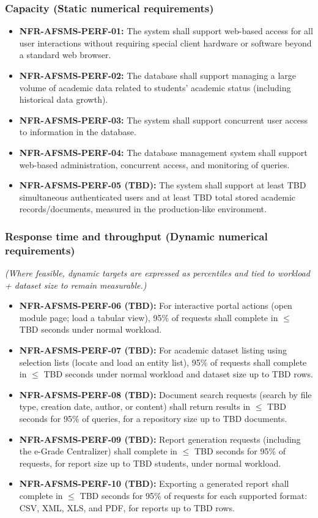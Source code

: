 \documentclass[11pt, a4paper]{article}
\begin{document}
\subsubsection{Capacity (Static numerical requirements)}
\begin{itemize}
    \item \textbf{NFR-AFSMS-PERF-01:} The system shall support web-based access for all user interactions without requiring special client hardware or software beyond a standard web browser.
    \item \textbf{NFR-AFSMS-PERF-02:} The database shall support managing a large volume of academic data related to students' academic status (including historical data growth).
    \item \textbf{NFR-AFSMS-PERF-03:} The system shall support concurrent user access to information in the database.
    \item \textbf{NFR-AFSMS-PERF-04:} The database management system shall support web-based administration, concurrent access, and monitoring of queries.
    \item \textbf{NFR-AFSMS-PERF-05 (TBD):} The system shall support at least TBD simultaneous authenticated users and at least TBD total stored academic records/documents, measured in the production-like environment.
\end{itemize}

\subsubsection{Response time and throughput (Dynamic numerical requirements)}
\textit{(Where feasible, dynamic targets are expressed as percentiles and tied to workload + dataset size to remain measurable.)}
\begin{itemize}
    \item \textbf{NFR-AFSMS-PERF-06 (TBD):} For interactive portal actions (open module page; load a tabular view), 95\% of requests shall complete in $\leq$ TBD seconds under normal workload.
    \item \textbf{NFR-AFSMS-PERF-07 (TBD):} For academic dataset listing using selection lists (locate and load an entity list), 95\% of requests shall complete in $\leq$ TBD seconds under normal workload and dataset size up to TBD rows.
    \item \textbf{NFR-AFSMS-PERF-08 (TBD):} Document search requests (search by file type, creation date, author, or content) shall return results in $\leq$ TBD seconds for 95\% of queries, for a repository size up to TBD documents.
    \item \textbf{NFR-AFSMS-PERF-09 (TBD):} Report generation requests (including the e-Grade Centralizer) shall complete in $\leq$ TBD seconds for 95\% of requests, for report size up to TBD students, under normal workload.
    \item \textbf{NFR-AFSMS-PERF-10 (TBD):} Exporting a generated report shall complete in $\leq$ TBD seconds for 95\% of requests for each supported format: CSV, XML, XLS, and PDF, for reports up to TBD rows.
\end{itemize}
\end{document}
